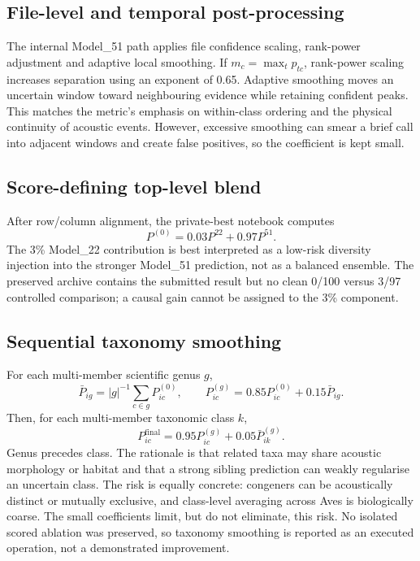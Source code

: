 \documentclass[10pt,a4paper]{article}
\begin{document}
\subsection{File-level and temporal post-processing}
The internal Model\_51 path applies file confidence scaling, rank-power adjustment and adaptive local smoothing. If $m_c=\max_t p_{tc}$, rank-power scaling increases separation using an exponent of 0.65. Adaptive smoothing moves an uncertain window toward neighbouring evidence while retaining confident peaks. This matches the metric's emphasis on within-class ordering and the physical continuity of acoustic events. However, excessive smoothing can smear a brief call into adjacent windows and create false positives, so the coefficient is kept small.

\subsection{Score-defining top-level blend}
After row/column alignment, the private-best notebook computes
\begin{equation}
P^{(0)}=0.03P^{22}+0.97P^{51}.
\end{equation}
The 3\% Model\_22 contribution is best interpreted as a low-risk diversity injection into the stronger Model\_51 prediction, not as a balanced ensemble. The preserved archive contains the submitted result but no clean 0/100 versus 3/97 controlled comparison; a causal gain cannot be assigned to the 3\% component.

\subsection{Sequential taxonomy smoothing}
For each multi-member scientific genus $g$,
\begin{equation}
\bar P_{ig}=|g|^{-1}\sum_{c\in g}P^{(0)}_{ic},\qquad
P^{(g)}_{ic}=0.85P^{(0)}_{ic}+0.15\bar P_{ig}.
\end{equation}
Then, for each multi-member taxonomic class $k$,
\begin{equation}
P^{\mathrm{final}}_{ic}=0.95P^{(g)}_{ic}+0.05\bar P^{(g)}_{ik}.
\end{equation}
Genus precedes class. The rationale is that related taxa may share acoustic morphology or habitat and that a strong sibling prediction can weakly regularise an uncertain class. The risk is equally concrete: congeners can be acoustically distinct or mutually exclusive, and class-level averaging across Aves is biologically coarse. The small coefficients limit, but do not eliminate, this risk. No isolated scored ablation was preserved, so taxonomy smoothing is reported as an executed operation, not a demonstrated improvement.
\end{document}
